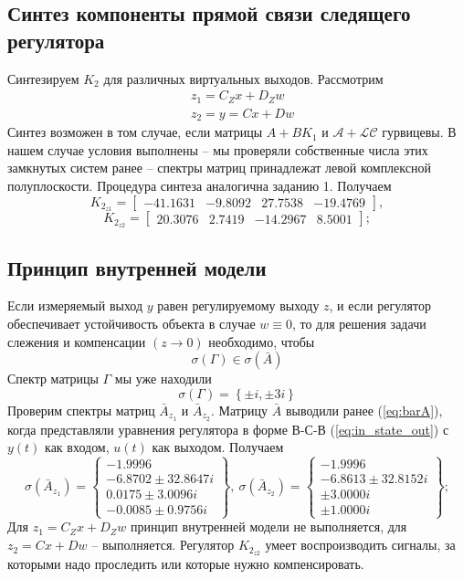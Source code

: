 \documentclass[a4paper, 12pt]{article}
\begin{document}
    \subsection{Синтез компоненты прямой связи следящего регулятора}
    Синтезируем $K_2$ для различных виртуальных выходов. Рассмотрим
    \begin{align*}
        &z_{1}=C_Zx+D_Zw\\
        &z_{2}=y=Cx+Dw
    \end{align*}
    Синтез возможен в том случае,
    если матрицы $A+BK_1$ и $\mathcal{A}+\mathcal{L}\mathcal{C}$ гурвицевы.
    В нашем случае условия выполнены -- мы проверяли собственные числа
    этих замкнутых систем ранее -- спектры матриц принадлежат левой комплексной полуплоскости.
    Процедура синтеза аналогична заданию 1. Получаем
    $$
    K_{2_{z1}}=\begin{bmatrix}
        -41.1631   &-9.8092   &27.7538  &-19.4769
    \end{bmatrix},
    $$
    $$
    K_{2_{z2}}=\begin{bmatrix}
        20.3076    &2.7419  &-14.2967    &8.5001
    \end{bmatrix};
    $$


    \subsection{Принцип внутренней модели}
    Если измеряемый выход $y$ равен регулируемому выходу $z$, и если
    регулятор обеспечивает устойчивость объекта в случае $w\equiv0$,
    то для решения задачи слежения и компенсации $\left( z\to0 \right)$
    необходимо, чтобы $$\sigma\left( \Gamma \right)\in\sigma\left( \bar{A} \right)$$
    Спектр матрицы $\Gamma$ мы уже находили
    $$
    \sigma\left( \Gamma \right)=\left\{ \pm i, \pm 3i \right\}
    $$
    Проверим спектры матриц $\bar{A}_{z_1}$ и $\bar{A}_{z_2}$. Матрицу $\bar{A}$
    выводили ранее (\ref{eq:barA}), когда представляли уравнения регулятора в форме
    В-С-В (\ref{eq:in_state_out}) с $y(t)$ как входом, $u(t)$ как выходом. Получаем
    $$
    \sigma\left( \bar{A}_{z_1} \right)=\left\{\begin{matrix}
        -1.9996\\
        -6.8702 \pm32.8647i\\
        0.0175 \pm 3.0096i\\
        -0.0085 \pm 0.9756i
    \end{matrix}\right\},\ \sigma\left( \bar{A}_{z_2} \right)=\left\{\begin{matrix}
        -1.9996\\
        -6.8613 \pm32.8152i\\
        \pm3.0000i\\
        \pm1.0000i
    \end{matrix}\right\};
    $$
    Для $z_1=C_Zx+D_Zw$ принцип внутренней модели не выполняется, для
    $z_2=Cx+Dw$ -- выполняется. Регулятор $K_{2_{z2}}$ умеет воспроизводить
    сигналы, за которыми надо проследить или которые нужно компенсировать.
\end{document}
